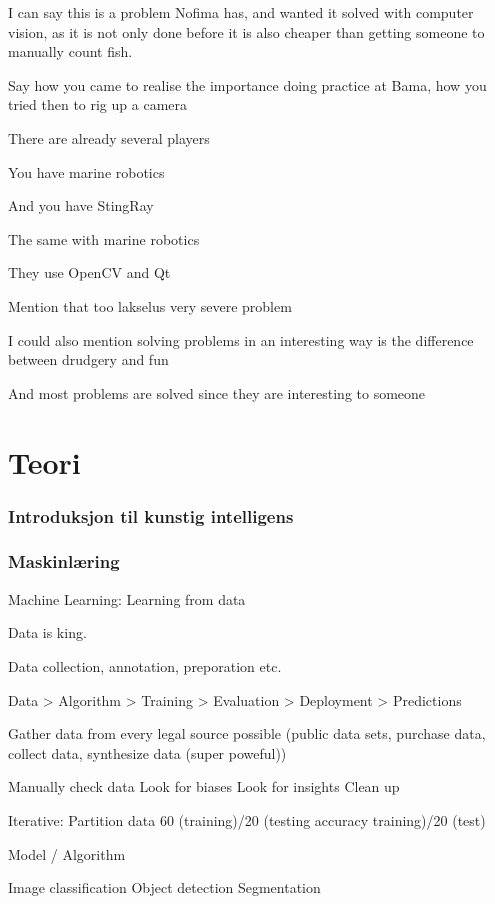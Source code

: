 I can say this is a problem Nofima has, and wanted it solved with computer vision, as it is not only done before it is also cheaper than getting someone to manually count fish.

Say how you came to realise the importance doing practice at Bama, how you tried then to rig up a camera

There are already several players

You have marine robotics

And you have StingRay

The same with marine robotics

They use OpenCV and Qt

Mention that too lakselus very severe problem

I could also mention solving problems in an interesting way is the difference between drudgery and fun

And most problems are solved since they are interesting to someone

\section{Teori}

\subsubsection{Introduksjon til kunstig intelligens}

\subsubsection{Maskinlæring}

Machine Learning: Learning from data

Data is king.

Data collection, annotation, preporation etc.

Data > Algorithm > Training > Evaluation > Deployment > Predictions

	Gather data from every legal source possible (public data sets, purchase data, collect data, synthesize data (super poweful))

	Manually check data
	Look for biases
	Look for insights
	Clean up

	Iterative: Partition data 60 (training)/20 (testing accuracy training)/20 (test)

Model / Algorithm

	Image classification
	Object detection 
	Segmentation

